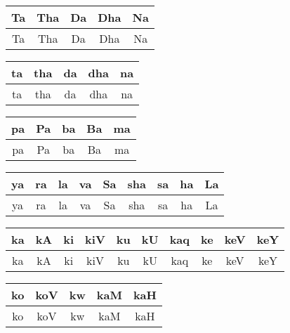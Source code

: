 \documentclass{article}
\begin{document}
\bigskip
\begin{tabular}{|c|c|c|c|c|}
\hline
{\rm Ta} & {\rm Tha} & {\rm Da} &  {\rm Dha} & {\rm Na}\\ 
\hline
Ta & Tha & Da & Dha & Na\\
\hline
\end{tabular}

\bigskip
\begin{tabular}{|c|c|c|c|c|}
\hline
{\rm ta} & {\rm tha} & {\rm da} &  {\rm dha} & {\rm na}\\ 
\hline
ta & tha & da & dha & na\\
\hline
\end{tabular}

\bigskip
\begin{tabular}{|c|c|c|c|c|}
\hline
{\rm pa} & {\rm Pa} & {\rm ba} &  {\rm Ba} & {\rm ma}\\ 
\hline
pa & Pa & ba & Ba & ma\\
\hline
\end{tabular}

\bigskip
\begin{tabular}{|c|c|c|c|c|c|c|c|c|}
\hline
{\rm ya} & {\rm ra} & {\rm la} & {\rm va} & {\rm Sa} & {\rm sha} & {\rm sa} & {\rm
ha} & {\rm La}\\
\hline
ya & ra & la & va & Sa & sha & sa & ha & La\\
\hline
\end{tabular}

\bigskip
\begin{tabular}{|c|c|c|c|c|c|c|c|c|c|}
\hline
{\rm ka} & {\rm kA} & {\rm ki} & {\rm kiV} & {\rm ku} & {\rm kU} & {\rm kaq} & {\rm
ke} & {\rm keV} & {\rm keY} \\ 
\hline
ka & kA & ki & kiV & ku & kU & kaq & ke & keV & keY \\
\hline
\end{tabular}

\bigskip
\begin{tabular}{|c|c|c|c|c|}
\hline
{\rm ko} & {\rm koV} & {\rm kw} & {\rm kaM} &
{\rm kaH} \\
\hline
 ko & koV & kw & kaM &
kaH \\
\hline
\end{tabular}
\eject
\end{document}
